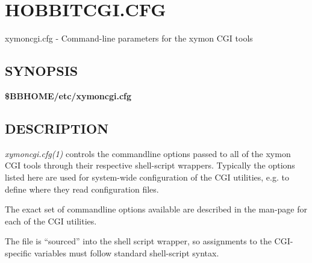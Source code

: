  
%
%
\newpage
\section{HOBBITCGI.CFG}
 xymoncgi.cfg - Command-line parameters for the xymon CGI tools 

 
\subsection{SYNOPSIS}
\textbf{\$BBHOME/etc/xymoncgi.cfg}


 
\subsection{DESCRIPTION}
\emph{xymoncgi.cfg(1)}
 controls the commandline options passed to all of the xymon CGI tools through their respective shell-script wrappers. Typically the options listed here are used for system-wide configuration of the CGI utilities, e.g. to define where they read configuration files. 

  The exact set of commandline options available are described in the man-page for each of the CGI utilities. 


  The file is ``sourced'' into the shell script wrapper, so assignments to the CGI-specific variables must follow standard shell-script syntax. 


 
